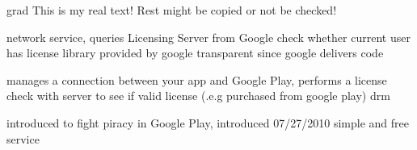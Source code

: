 grad%
This is my real text! Rest might be copied or not be checked!

%
network service, queries Licensing Server from Google
check whether current user has license
library provided by google
transparent since google delivers code

\cite{munteanLicense}
%

%
manages a connection between your app and Google Play, performs a license check with server to see if valid license (.e.g purchased from google play)
\gls{drm}
\cite{digipomLvl}
%

%
introduced to fight piracy in Google Play, introduced 07/27/2010
simple and free service
\cite{developersLicensingBlog}
%
